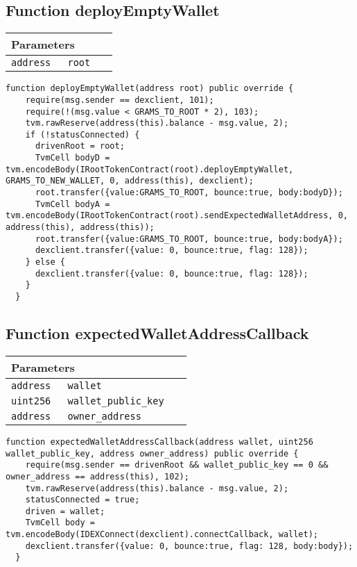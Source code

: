 \subsection{Function deployEmptyWallet}


\ifsoltables
\noindent\begin{tabular}{|l|l|p{5cm}|}\hline
\multicolumn{3}{|l|}{\bf Parameters}\\\hline
\tt address & \tt root &\\\hline
\end{tabular}
\fi

\vspace{2cm}

\begin{lstlisting}[firstnumber=60]
  function deployEmptyWallet(address root) public override {
    require(msg.sender == dexclient, 101);
    require(!(msg.value < GRAMS_TO_ROOT * 2), 103);
    tvm.rawReserve(address(this).balance - msg.value, 2);
    if (!statusConnected) {
      drivenRoot = root;
      TvmCell bodyD = tvm.encodeBody(IRootTokenContract(root).deployEmptyWallet, GRAMS_TO_NEW_WALLET, 0, address(this), dexclient);
      root.transfer({value:GRAMS_TO_ROOT, bounce:true, body:bodyD});
      TvmCell bodyA = tvm.encodeBody(IRootTokenContract(root).sendExpectedWalletAddress, 0, address(this), address(this));
      root.transfer({value:GRAMS_TO_ROOT, bounce:true, body:bodyA});
      dexclient.transfer({value: 0, bounce:true, flag: 128});
    } else {
      dexclient.transfer({value: 0, bounce:true, flag: 128});
    }
  }
\end{lstlisting}

\subsection{Function expectedWalletAddressCallback}


\ifsoltables
\noindent\begin{tabular}{|l|l|p{5cm}|}\hline
\multicolumn{3}{|l|}{\bf Parameters}\\\hline
\tt address & \tt wallet &\\\hline
\tt uint256 & \tt wallet\_{}public\_{}key &\\\hline
\tt address & \tt owner\_{}address &\\\hline
\end{tabular}
\fi

\vspace{2cm}

\begin{lstlisting}[firstnumber=77]
  function expectedWalletAddressCallback(address wallet, uint256 wallet_public_key, address owner_address) public override {
    require(msg.sender == drivenRoot && wallet_public_key == 0 && owner_address == address(this), 102);
    tvm.rawReserve(address(this).balance - msg.value, 2);
    statusConnected = true;
    driven = wallet;
    TvmCell body = tvm.encodeBody(IDEXConnect(dexclient).connectCallback, wallet);
    dexclient.transfer({value: 0, bounce:true, flag: 128, body:body});
  }
\end{lstlisting}

